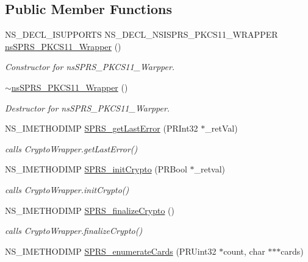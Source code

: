 \subsection*{Public Member Functions}
\begin{DoxyCompactItemize}
\item 
NS\_\-DECL\_\-ISUPPORTS NS\_\-DECL\_\-NSISPRS\_\-PKCS11\_\-WRAPPER \hyperlink{classnsSPRS__PKCS11__Wrapper_aae53c562eb02e180de0efd9e38a8a13a}{nsSPRS\_\-PKCS11\_\-Wrapper} ()
\begin{DoxyCompactList}\small\item\em Constructor for nsSPRS\_\-PKCS11\_\-Warpper. \item\end{DoxyCompactList}\item 
\hyperlink{classnsSPRS__PKCS11__Wrapper_ae47d3a38404472caa713ff194f085cf5}{$\sim$nsSPRS\_\-PKCS11\_\-Wrapper} ()
\begin{DoxyCompactList}\small\item\em Destructor for nsSPRS\_\-PKCS11\_\-Warpper. \item\end{DoxyCompactList}\item 
NS\_\-IMETHODIMP \hyperlink{classnsSPRS__PKCS11__Wrapper_a5f2388ba9ac1bfc39f78b872ede8b877}{SPRS\_\-getLastError} (PRInt32 $\ast$\_\-retVal)
\begin{DoxyCompactList}\small\item\em calls CryptoWrapper.getLastError() \item\end{DoxyCompactList}\item 
NS\_\-IMETHODIMP \hyperlink{classnsSPRS__PKCS11__Wrapper_a474e38625c00c8a61bb890e2db670682}{SPRS\_\-initCrypto} (PRBool $\ast$\_\-retval)
\begin{DoxyCompactList}\small\item\em calls CryptoWrapper.initCrypto() \item\end{DoxyCompactList}\item 
NS\_\-IMETHODIMP \hyperlink{classnsSPRS__PKCS11__Wrapper_ab27291133f224017cdaadcceaa0b52c8}{SPRS\_\-finalizeCrypto} ()
\begin{DoxyCompactList}\small\item\em calls CryptoWrapper.finalizeCrypto() \item\end{DoxyCompactList}\item 
NS\_\-IMETHODIMP \hyperlink{classnsSPRS__PKCS11__Wrapper_aacfd858ce01bfef5569c28b8f91b4f90}{SPRS\_\-enumerateCards} (PRUint32 $\ast$count, char $\ast$$\ast$$\ast$cards)

\end{DoxyCompactItemize}
